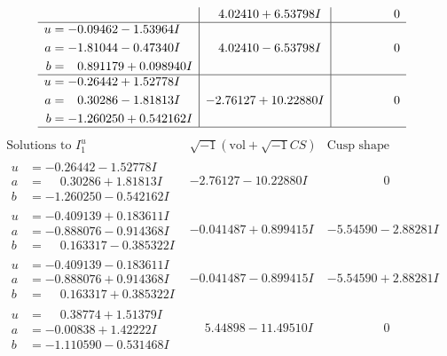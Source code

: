 \documentclass[1p]{elsarticle_modified}
\theoremstyle{definition}
\newcommand{\I}{\sqrt{-1}}
\begin{document}
$$\begin{array}{c|c|c}
 & \phantom{-}4.02410 + 6.53798 I & \phantom{-0.000000 } 0 \\ \hline\begin{aligned}
u &= -0.09462 - 1.53964 I \\
a &= -1.81044 - 0.47340 I \\
b &= \phantom{-}0.891179 + 0.098940 I\end{aligned}
 & \phantom{-}4.02410 - 6.53798 I & \phantom{-0.000000 } 0 \\ \hline\begin{aligned}
u &= -0.26442 + 1.52778 I \\
a &= \phantom{-}0.30286 - 1.81813 I \\
b &= -1.260250 + 0.542162 I\end{aligned}
 & -2.76127 + 10.22880 I & \phantom{-0.000000 } 0\\
 \hline 
 \end{array}$$\newpage$$\begin{array}{c|c|c}  
\text{Solutions to }I^u_{1}& \I (\text{vol} + \sqrt{-1}CS) & \text{Cusp shape}\\
 \hline 
\begin{aligned}
u &= -0.26442 - 1.52778 I \\
a &= \phantom{-}0.30286 + 1.81813 I \\
b &= -1.260250 - 0.542162 I\end{aligned}
 & -2.76127 - 10.22880 I & \phantom{-0.000000 } 0 \\ \hline\begin{aligned}
u &= -0.409139 + 0.183611 I \\
a &= -0.888076 - 0.914368 I \\
b &= \phantom{-}0.163317 - 0.385322 I\end{aligned}
 & -0.041487 + 0.899415 I & -5.54590 - 2.88281 I \\ \hline\begin{aligned}
u &= -0.409139 - 0.183611 I \\
a &= -0.888076 + 0.914368 I \\
b &= \phantom{-}0.163317 + 0.385322 I\end{aligned}
 & -0.041487 - 0.899415 I & -5.54590 + 2.88281 I \\ \hline\begin{aligned}
u &= \phantom{-}0.38774 + 1.51379 I \\
a &= -0.00838 + 1.42222 I \\
b &= -1.110590 - 0.531468 I\end{aligned}
 & \phantom{-}5.44898 - 11.49510 I & \phantom{-0.000000 } 0 \\ \hline\begin{aligned}

\end{aligned}
\end{array}$$
\end{document}
